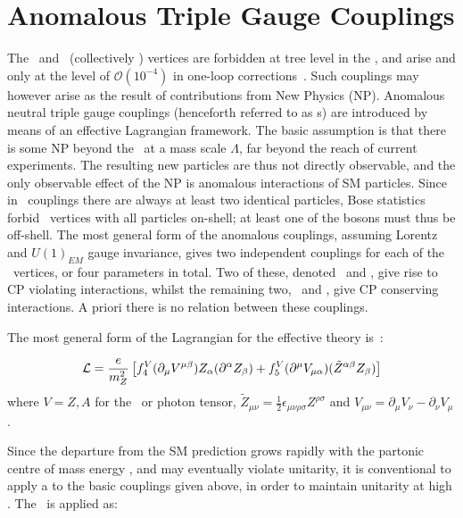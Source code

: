 \section{Anomalous Triple Gauge Couplings}
\label{sec:TheoryZZ-TGCs}

The \ZZZ\ and \ZZg\ (collectively \ZZV) vertices are forbidden at tree level
in the \sm, and arise 
and only
at the level of  $\mathcal{O}(10^{-4})$ in one-loop
corrections~\cite{Gounaris:2000dn}.
Such couplings may however arise as the result of contributions from New Physics (NP).
Anomalous neutral triple gauge couplings (henceforth referred to as \TGC s) are introduced by means of an effective
Lagrangian framework. The basic assumption is that there is some NP beyond the
\sm\ at a mass scale $\Lambda$, far beyond the reach of current experiments. The resulting
new particles are thus not directly observable, and the only observable effect
of the NP is anomalous interactions of SM particles. Since in \ZZV\ couplings
there are always at least two identical particles, Bose statistics forbid \ZZV\
vertices with all particles on-shell; at least one of the bosons must thus be
off-shell. The most general form of the anomalous couplings, assuming Lorentz
and $U(1)_{EM}$ gauge invariance, gives two independent couplings for each of
the \ZZV\ vertices, or four parameters in total. Two of these, denoted
\ffourZ\ and \ffourg, give rise to CP violating interactions, whilst the
remaining two, \ffiveZ\ and \ffiveg, give CP conserving interactions. A priori
there is no relation between these couplings. 

The most general form of the Lagrangian for the effective theory is~\cite{Gounaris:1999kf}:

\begin{align}
\label{eqn:tgc-lagrangian}
\mathcal{L} = \frac{e}{m_{Z}^{2}} \left[ 
f_{4}^{V}(\partial_{\mu}V^{\mu\beta})Z_{\alpha}(\partial^{\alpha}Z_{\beta}) +
f_{5}^{V}(\partial^{\mu}V_{\mu\alpha})(\tilde{Z}^{\alpha\beta}Z_{\beta}) \right]
\end{align}
where $V=Z,A$ for the \Z\ or photon tensor, $\tilde{Z}_{\mu\nu} = \frac{1}{2}
\epsilon_{\mu\nu\rho\sigma}Z^{\rho\sigma}$ and $V_{\mu\nu} = \partial_{\mu}V_{\nu}
- \partial_{\nu}V_{\mu}$.

Since the departure from the SM prediction grows rapidly with the partonic
centre of mass energy \sqrtshat, and may eventually violate unitarity, it is
conventional to apply a \intro{\formfactor} to the basic couplings given above,
in order to maintain unitarity at high \sqrtshat. The \formfactor\ is applied as:

